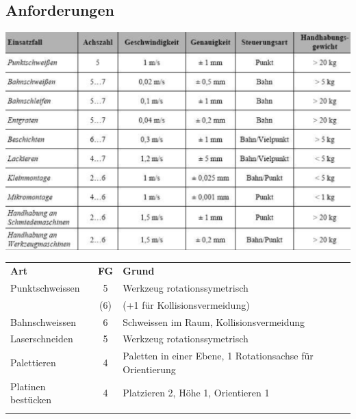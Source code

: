 \begin{minipage}{0.5\linewidth}
\subsection{Anforderungen}
\includegraphics[width=\linewidth]{./bilder/anforderung}
{\small 
\begin{tabular}{lcp{5.3cm}}
	\textbf{Art}& \textbf{FG}&\textbf{Grund}\\
	Punktschweissen& 5& Werkzeug rotationssymetrisch\\
	&(6)&(+1 für Kollisionsvermeidung)\\
	Bahnschweissen&6&Schweissen im Raum, Kollisionsvermeidung\\
	Laserschneiden&5&Werkzeug rotationssymetrisch\\
	Palettieren&4&Paletten in einer Ebene, 1 Rotationsachse für Orientierung\\
	Platinen bestücken&4&Platzieren 2, Höhe 1, Orientieren 1\\
	&&\\
\end{tabular}
}
\end{minipage}

